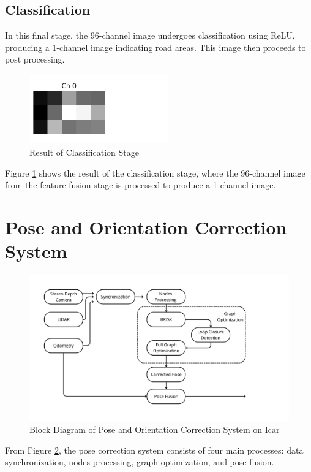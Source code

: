 \subsection{Classification}
In this final stage, the 96-channel image undergoes classification using ReLU, producing a 1-channel image indicating road areas. This image then proceeds to post processing.
\begin{figure}[H]
	\centering
	\includegraphics[width=6cm]{../konten/class_1.png}
	\caption{Result of Classification Stage}
	\label{fig:ml_cls0}
\end{figure} 
Figure \ref{fig:ml_cls0} shows the result of the classification stage, where the 96-channel image from the feature fusion stage is processed to produce a 1-channel image. 

\section{Pose and Orientation Correction System}
\begin{figure}[H]
	\centering
	\includegraphics[width=\linewidth]{../konten/GNSS(20).png}
	\caption{Block Diagram of Pose and Orientation Correction System on Icar}
	\label{fig:slam_system}
\end{figure} 

From Figure \ref{fig:slam_system}, the pose correction system consists of four main processes: data synchronization, nodes processing, graph optimization, and pose fusion.

